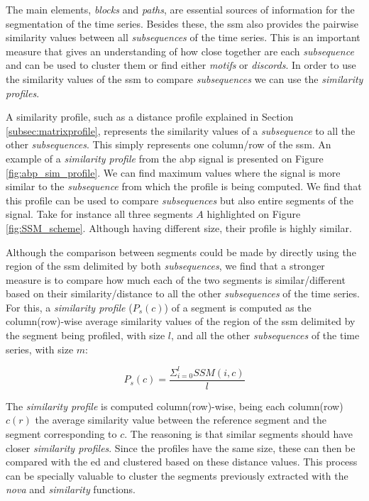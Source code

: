 The main elements, \textit{blocks} and \textit{paths}, are essential sources of information for the segmentation of the time series. Besides these, the \gls{ssm} also provides the pairwise similarity values between all \textit{subsequences} of the time series. This is an important measure that gives an understanding of how close together are each \textit{subsequence} and can be used to cluster them or find either \textit{motifs} or \textit{discords}. In order to use the similarity values of the \gls{ssm} to compare \textit{subsequences} we can use the \textit{similarity profiles}. 
\par
A similarity profile, such as a distance profile explained in Section \ref{subsec:matrixprofile}, represents the similarity values of a \textit{subsequence} to all the other \textit{subsequences}. This simply represents one column/row of the \gls{ssm}. An example of a \textit{similarity profile} from the \gls{abp} signal is presented on Figure \ref{fig:abp_sim_profile}. We can find maximum values where the signal is more similar to the \textit{subsequence} from which the profile is being computed. We find that this profile can be used to compare \textit{subsequences} but also entire segments of the signal. Take for instance all three segments $A$ highlighted on Figure \ref{fig:SSM_scheme}. Although having different size, their profile is highly similar. 
\par
Although the comparison between segments could be made by directly using the region of the \gls{ssm} delimited by both \textit{subsequences}, we find that a stronger measure is to compare how much each of the two segments is similar/different based on their similarity/distance to all the other \textit{subsequences} of the time series. For this, a \textit{similarity profile} ($P_s(c)$) of a segment is computed as the column(row)-wise average similarity values of the region of the \gls{ssm} delimited by the segment being profiled, with size $l$, and all the other \textit{subsequences} of the time series, with size $m$:

\begin{equation}
P_s(c) = \frac{\Sigma_{i=0}^l SSM(i, c)}{l}
\end{equation}

The \textit{similarity profile} is computed column(row)-wise, being each column(row) $c(r)$ the average similarity value between the reference segment and the segment corresponding to $c$. The reasoning is that similar segments should have closer \textit{similarity profiles}. Since the profiles have the same size, these can then be compared with the \gls{ed} and clustered based on these distance values. This process can be specially valuable to cluster the segments previously extracted with the \textit{nova} and \textit{similarity} functions.

